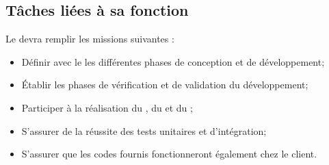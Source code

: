 \subsection*{Tâches liées à sa fonction}

Le \RD{} devra remplir les missions suivantes :
\begin{itemize}
	\item Définir avec le \CP{} les différentes phases de conception et de développement;
	\item Établir les phases de vérification et de validation du développement;

	\item Participer à la réalisation du \DSECourt{}, du \DSICourt{} et du \PTVCourt;

	\item S'assurer de la réussite des tests unitaires et d'intégration;
	\item S'assurer que les codes fournis fonctionneront également chez le client.
\end{itemize}